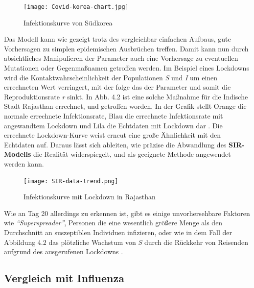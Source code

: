 \documentclass[12pt]{scrartcl} %
\begin{document}
	\begin{figure}[h]
	\centering
	\texttt{[image: Covid-korea-chart.jpg]}
	\caption[Infektionskurve von Südkorea,\newline https://cmte.ieee.org/futuredirections/tech-policy-ethics/may-2020/covid-19-disease-modelling-and-its-impact-on-public-health-policy/]{Infektionskurve von Südkorea}
	\end{figure}
	
	\newpage
	
Das Modell kann wie gezeigt trotz des vergleichbar einfachen Aufbaus, gute Vorhersagen zu simplen epidemischen Ausbrüchen treffen.
Damit kann nun durch absichtliches Manipulieren der Parameter auch eine Vorhersage zu eventuellen Mutationen oder Gegenmaßnamen getroffen werden. Im Beispiel eines Lockdowns wird die Kontaktwahrscheinlichkeit der Populationen \textit{S} und \textit{I} um einen errechneten Wert verringert, mit der folge das der Parameter \textbeta\space und somit die Reproduktionsrate \textit{r} sinkt. In Abb. 4.2 ist eine solche Maßnahme für die Indische Stadt Rajasthan errechnet, und getroffen worden. In der Grafik stellt Orange die normale errechnete Infektionsrate, Blau die errechnete Infektionsrate mit angewandtem Lockdown und Lila die Echtdaten mit Lockdown dar \cite{3, 10, 11}. Die errechnete Lockdown-Kurve weist erneut eine große Ähnlichkeit mit den Echtdaten auf.
Daraus lässt sich ableiten, wie präzise die Abwandlung des \textbf{SIR-Modells} die Realität widerspiegelt, und als geeignete Methode angewendet werden kann.
	
	\begin{figure}[h]
	\centering
	\texttt{[image: SIR-data-trend.png]}
	\caption[Infektionskurve mit Lockdown in Rajasthan,\newline Entnommen aus: \cite{3}]{Infektionskurve mit Lockdown in Rajasthan}
	\end{figure}
	
Wie an Tag 20 allerdings zu erkennen ist, gibt es einige unvorhersehbare Faktoren wie \textsl{"`Superspreader"'}, Personen die eine wesentlich größere Menge als den Durchschnitt an suszeptiblen Individuen infizieren, oder wie in dem Fall der Abbildung 4.2 das plötzliche Wachstum von \textsl{S} durch die Rückkehr von Reisenden aufgrund des ausgerufenen Lockdowns \cite{3, 11}.


\subsection{Vergleich mit Influenza}
\end{document}

